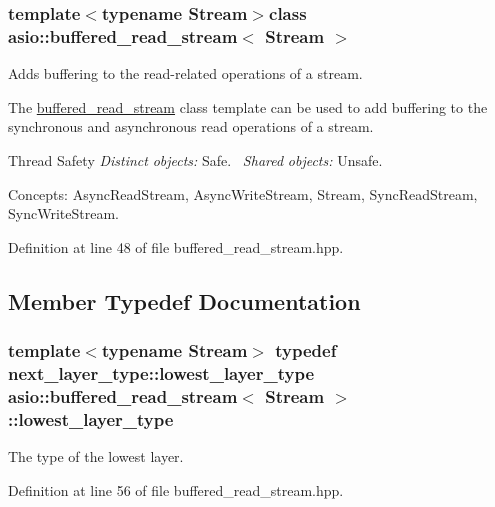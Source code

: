 \subsubsection*{template$<$typename Stream$>$class asio\+::buffered\+\_\+read\+\_\+stream$<$ Stream $>$}

Adds buffering to the read-\/related operations of a stream. 

The \hyperlink{classasio_1_1buffered__read__stream}{buffered\+\_\+read\+\_\+stream} class template can be used to add buffering to the synchronous and asynchronous read operations of a stream.

\begin{DoxyParagraph}{Thread Safety}
{\itshape Distinct} {\itshape objects\+:} Safe.~\newline
{\itshape Shared} {\itshape objects\+:} Unsafe.
\end{DoxyParagraph}
\begin{DoxyParagraph}{Concepts\+:}
Async\+Read\+Stream, Async\+Write\+Stream, Stream, Sync\+Read\+Stream, Sync\+Write\+Stream. 
\end{DoxyParagraph}


Definition at line 48 of file buffered\+\_\+read\+\_\+stream.\+hpp.



\subsection{Member Typedef Documentation}
\hypertarget{classasio_1_1buffered__read__stream_a041a7cecfeb013857bd1839dcd43de49}{}
\subsubsection[{lowest\+\_\+layer\+\_\+type}]{\setlength{\rightskip}{0pt plus 5cm}template$<$typename Stream$>$ typedef next\+\_\+layer\+\_\+type\+::lowest\+\_\+layer\+\_\+type {\bf asio\+::buffered\+\_\+read\+\_\+stream}$<$ Stream $>$\+::{\bf lowest\+\_\+layer\+\_\+type}}\label{classasio_1_1buffered__read__stream_a041a7cecfeb013857bd1839dcd43de49}


The type of the lowest layer. 



Definition at line 56 of file buffered\+\_\+read\+\_\+stream.\+hpp.

